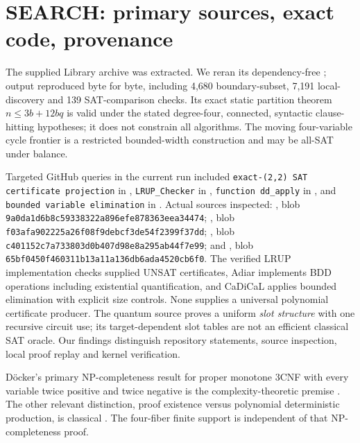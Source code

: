 \documentclass[11pt]{article}
\begin{document}
\section{SEARCH: primary sources, exact code, provenance}
The supplied Library archive  was extracted. We reran its dependency-free ; output  reproduced byte for byte, including 4,680 boundary-subset, 7,191 local-discovery and 139 SAT-comparison checks. Its exact static partition theorem $n\le3b+12bq$ is valid under the stated degree-four, connected, syntactic clause-hitting hypotheses; it does not constrain all algorithms. The moving four-variable cycle frontier is a restricted bounded-width construction and may be all-SAT under balance.

Targeted GitHub queries in the current run included \texttt{exact-(2,2) SAT certificate projection} in , \texttt{LRUP\_Checker} in , \texttt{function dd\_apply} in , and \texttt{bounded variable elimination} in . Actual sources inspected: , blob \texttt{9a0da1d6b8c59338322a896efe878363eea34474}; , blob \texttt{f03afa902225a26f08f9debcf3de54f2399f37dd}; , blob \texttt{c401152c7a733803d0b407d98e8a295ab44f7e99}; and , blob \texttt{65bf0450f460311b13a11a136db6ada4520cb6f0}. The verified LRUP implementation checks supplied UNSAT certificates, Adiar implements BDD operations including existential quantification, and CaDiCaL applies bounded elimination with explicit size controls. None supplies a universal polynomial certificate producer. The quantum source proves a uniform \emph{slot structure} with one recursive circuit use; its target-dependent slot tables are not an efficient classical SAT oracle. Our findings distinguish repository statements, source inspection, local proof replay and kernel verification.

D\"ocker's primary NP-completeness result for proper monotone 3CNF with every variable twice positive and twice negative is the complexity-theoretic premise \cite{doecker}. The other relevant distinction, proof existence versus polynomial deterministic production, is classical \cite{cookreckhow}. The four-fiber finite support is independent of that NP-completeness proof.
\end{document}
